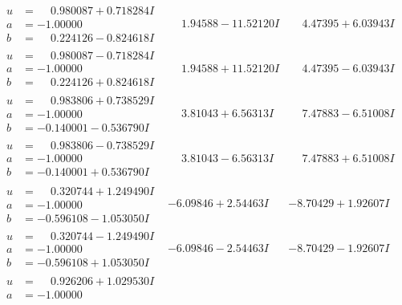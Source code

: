 \documentclass[1p]{elsarticle_modified}
\theoremstyle{definition}
\begin{document}
$$\begin{array}{c|c|c}
\begin{aligned}
u &= \phantom{-}0.980087 + 0.718284 I \\
a &= -1.00000\phantom{ +0.000000I} \\
b &= \phantom{-}0.224126 - 0.824618 I\end{aligned}
 & \phantom{-}1.94588 - 11.52120 I & \phantom{-}4.47395 + 6.03943 I \\ \hline\begin{aligned}
u &= \phantom{-}0.980087 - 0.718284 I \\
a &= -1.00000\phantom{ +0.000000I} \\
b &= \phantom{-}0.224126 + 0.824618 I\end{aligned}
 & \phantom{-}1.94588 + 11.52120 I & \phantom{-}4.47395 - 6.03943 I \\ \hline\begin{aligned}
u &= \phantom{-}0.983806 + 0.738529 I \\
a &= -1.00000\phantom{ +0.000000I} \\
b &= -0.140001 - 0.536790 I\end{aligned}
 & \phantom{-}3.81043 + 6.56313 I & \phantom{-}7.47883 - 6.51008 I \\ \hline\begin{aligned}
u &= \phantom{-}0.983806 - 0.738529 I \\
a &= -1.00000\phantom{ +0.000000I} \\
b &= -0.140001 + 0.536790 I\end{aligned}
 & \phantom{-}3.81043 - 6.56313 I & \phantom{-}7.47883 + 6.51008 I \\ \hline\begin{aligned}
u &= \phantom{-}0.320744 + 1.249490 I \\
a &= -1.00000\phantom{ +0.000000I} \\
b &= -0.596108 - 1.053050 I\end{aligned}
 & -6.09846 + 2.54463 I & -8.70429 + 1.92607 I \\ \hline\begin{aligned}
u &= \phantom{-}0.320744 - 1.249490 I \\
a &= -1.00000\phantom{ +0.000000I} \\
b &= -0.596108 + 1.053050 I\end{aligned}
 & -6.09846 - 2.54463 I & -8.70429 - 1.92607 I \\ \hline\begin{aligned}
u &= \phantom{-}0.926206 + 1.029530 I \\
a &= -1.00000\phantom{ +0.000000I} \\

\end{aligned}
\end{array}$$
\end{document}
